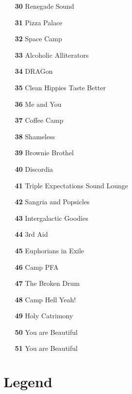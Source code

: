 \begin{multicols}{2}
\begin{itemize}[itemsep=.0125mm,parsep=2pt]
\item[\textbf{ 30 }] Renegade Sound
\item[\textbf{ 31 }] Pizza Palace
\item[\textbf{ 32 }] Space Camp
\item[\textbf{ 33 }] Alcoholic Alliterators
\item[\textbf{ 34 }] DRAGon
\item[\textbf{ 35 }] Clean Hippies Taste Better
\item[\textbf{ 36 }] Me and You
\item[\textbf{ 37 }] Coffee Camp
\item[\textbf{ 38 }] Shameless
\item[\textbf{ 39 }] Brownie Brothel
\item[\textbf{ 40 }] Discordia
\item[\textbf{ 41 }] Triple Expectations Sound Lounge
\item[\textbf{ 42 }] Sangria and Popsicles
\item[\textbf{ 43 }] Intergalactic Goodies
\item[\textbf{ 44 }] 3rd Aid
\item[\textbf{ 45 }] Euphorians in Exile
\item[\textbf{ 46 }] Camp PFA
\item[\textbf{ 47 }] The Broken Drum
\item[\textbf{ 48 }] Camp Hell Yeah!
\item[\textbf{ 49 }] Holy Catrimony
\item[\textbf{ 50 }] You are Beautiful
\item[\textbf{ 51 }] You are Beautiful
\end{itemize}


\end{multicols}

\section*{Legend}

